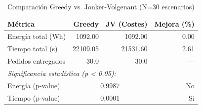 \begin{table}[htbp]
\centering
\caption{Comparación Greedy vs. Jonker-Volgenant (N=30 escenarios)}
\label{tab:comparison}
\begin{tabular}{lrrr}
\hline
\textbf{Métrica} & \textbf{Greedy} & \textbf{JV (Costes)} & \textbf{Mejora (\%)} \\
\hline
Energía total (Wh) & 1092.00 & 1092.00 & 0.00 \\
Tiempo total (s) & 22109.05 & 21531.60 & 2.61 \\
Pedidos entregados & 30.0 & 30.0 & — \\
\hline
\multicolumn{4}{l}{\textit{Significancia estadística (p < 0.05):}} \\
Energía (p-value) & \multicolumn{2}{c}{0.9987} & No \\
Tiempo (p-value) & \multicolumn{2}{c}{0.0001} & Sí \\
\hline
\end{tabular}
\end{table}